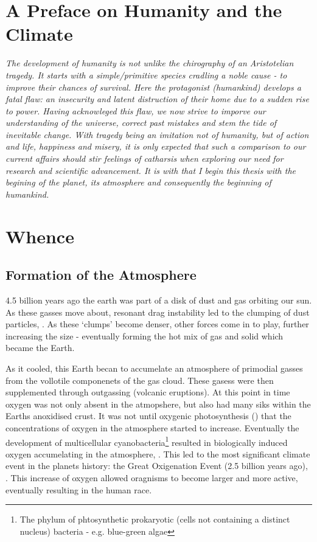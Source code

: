 
\section*{A Preface on Humanity and the Climate}
\begin{flushleft}\emph{
The development of humanity is not unlike the chirography of an Aristotelian tragedy. It starts with a simple/primitive species cradling a noble cause - to improve their chances of survival. Here the protagonist (humankind) develops a fatal flaw: an insecurity and latent distruction of their home due to a sudden rise to power. 
Having acknowleged this flaw, we now strive to imporve our understanding of the universe, correct past mistakes and stem the tide of inevitable change. \vspace{\baselineskip}\linebreak
With tragedy being an imitation not of humanity, but of action and life, happiness and misery, it is only expected that such a comparison to our current affairs should stir feelings of catharsis when exploring our need for research and scientific advancement. 
It is with that I begin this thesis with the begining of the planet, its atmosphere and consequently the beginning of humankind. 
}
\end{flushleft}

\section{Whence}
\subsection{Formation of the Atmosphere}
 4.5 billion years ago the earth was part of a disk of dust and gas orbiting our sun. As these gasses move about, resonant drag instability led to the clumping of dust particles, \cite{drag,planet}. As these `clumps' become denser, other forces come in to play, further increasing the size - eventually forming the hot mix of gas and solid which became the Earth. 

As it cooled, this Earth becan to accumelate an atmosphere of primodial gasses from the vollotile componenets of the gas cloud. These gasess were then supplemented through outgassing (volcanic eruptions). At this point in time oxygen was not only absent in the atmopshere, but also had many siks within the Earths anoxidised crust. It was not until oxygenic photosynthesis (\cite{oxygenicphotosynthesis}) that the concentrations of oxygen in the atmosphere started to increase. Eventually the development of multicellular cyanobacteria\footnote{The phylum of phtosynthetic prokaryotic (cells not containing a distinct nucleus) bacteria - e.g. blue-green algae} resulted in biologically induced oxygen accumelating in the atmosphere, \cite{multicellular}. This led to the most significant climate event in the planets history: the Great Oxigenation Event (2.5 billion years ago), \cite{oxidation}. This increase of oxygen allowed oragnisms to become larger and more active, eventually resulting in the human race. 

